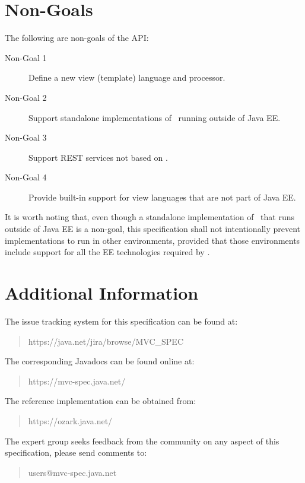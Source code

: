 \section{Non-Goals}
\label{non_goals}

The following are non-goals of the API:

\begin{description}
\item[Non-Goal 1] Define a new view (template) language and processor.
\item[Non-Goal 2] Support standalone implementations of \mvc\ running outside of Java EE.
\item[Non-Goal 3] Support REST services not based on \jaxrs.
\item[Non-Goal 4] Provide built-in support for view languages that are not part of Java EE.
\end{description}

It is worth noting that, even though a standalone implementation of \mvc\ that runs outside
of Java EE is a non-goal, this specification shall not intentionally prevent implementations
to run in other environments, provided that those environments include support for all the 
EE technologies required by \mvc.

\section{Additional Information}
\label{additional_information}

The issue tracking system for this specification can be found at:

\begin{quote}
https://java.net/jira/browse/MVC\_SPEC
\end{quote}

The corresponding Javadocs can be found online at:

\begin{quote}
https://mvc-spec.java.net/
\end{quote}

The reference implementation can be obtained from:

\begin{quote}
https://ozark.java.net/
\end{quote}

The expert group seeks feedback from the community on any aspect of this specification, please 
send comments to:

\begin{quote}
users@mvc-spec.java.net
\end{quote}

